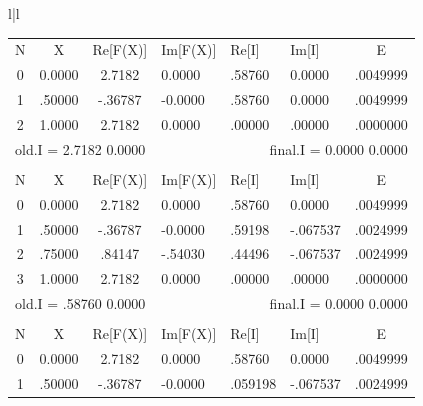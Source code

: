 \begin{figure}
    \tiny
    \setlength{\tabcolsep}{.2em}
    \begin{tabular}{l|l}

        \begin{tabular}{cccllll}
            \multicolumn{1}{c}{N}        & \multicolumn{1}{c}{X} &           \multicolumn{1}{c}{Re[F(X)]} & \multicolumn{1}{l}{Im[F(X)]} & 
            \multicolumn{1}{l}{Re[I]}    & \multicolumn{1}{l}{Im[I]} &
            \multicolumn{1}{c}{E} \\
            0 & 0.0000 & 2.7182  &  0.0000 & .58760 & 0.0000 & .0049999 \\
            1 & .50000 & -.36787 & -0.0000 & .58760 & 0.0000 & .0049999 \\
            2 & 1.0000 & 2.7182  &  0.0000 & .00000 & .00000 & .0000000 \\
            \multicolumn{3}{l}{old.I = 2.7182 0.0000} & &
            \multicolumn{3}{r}{final.I = 0.0000 0.0000} \\
        \\
            \multicolumn{1}{c}{N}        & \multicolumn{1}{c}{X} &           \multicolumn{1}{c}{Re[F(X)]} & \multicolumn{1}{l}{Im[F(X)]} & 
            \multicolumn{1}{l}{Re[I]}    & \multicolumn{1}{l}{Im[I]} &
            \multicolumn{1}{c}{E} \\
            0 & 0.0000 & 2.7182  &  0.0000 & .58760 & 0.0000   & .0049999 \\
            1 & .50000 & -.36787 & -0.0000 & .59198 & -.067537 & .0024999 \\
            2 & .75000 & .84147  & -.54030 & .44496 & -.067537 & .0024999 \\
            3 & 1.0000 & 2.7182  &  0.0000 & .00000 & .00000   & .0000000 \\
            \multicolumn{3}{l}{old.I = .58760 0.0000} & &
            \multicolumn{3}{r}{final.I = 0.0000 0.0000} \\
        \\
            \multicolumn{1}{c}{N}        & \multicolumn{1}{c}{X} &           \multicolumn{1}{c}{Re[F(X)]} & \multicolumn{1}{l}{Im[F(X)]} & 
            \multicolumn{1}{l}{Re[I]}    & \multicolumn{1}{l}{Im[I]} &
            \multicolumn{1}{c}{E} \\
            0 & 0.0000 & 2.7182  &  0.0000 & .58760  & 0.0000   & .0049999 \\
            1 & .50000 & -.36787 & -0.0000 & .059198 & -.067537 & .0024999 \\

\end{tabular}
\end{tabular}
\end{figure}
